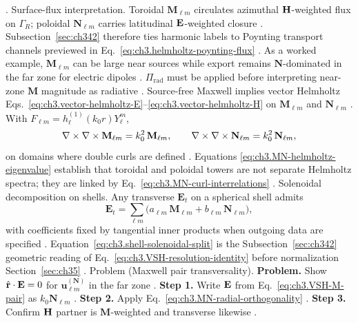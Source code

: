 \cite{harrington2001}.
Surface-flux interpretation. Toroidal \(\mathbf{M}_{\ell m}\) circulates azimuthal \(\mathbf{H}\)-weighted flux on \(\Gamma_R\); poloidal \(\mathbf{N}_{\ell m}\)
carries latitudinal \(\mathbf{E}\)-weighted closure \cite{stratton1941}. Subsection~\ref{sec:ch342} therefore ties
harmonic labels to Poynting transport channels previewed in Eq.~\eqref{eq:ch3.helmholtz-poynting-flux}
\cite{poynting1884}.
As a worked example, \(\mathbf{M}_{\ell m}\) can be large near sources while export remains \(\mathbf{N}\)-dominated in the far zone for
electric dipoles \cite{harrington2001}. \(\Pi_{\mathrm{rad}}\) must be applied before interpreting near-zone
\(\mathbf{M}\) magnitude as radiative \cite{harrington2001}.
Source-free Maxwell implies vector Helmholtz Eqs.~\eqref{eq:ch3.vector-helmholtz-E}--\eqref{eq:ch3.vector-helmholtz-H}
on \(\mathbf{M}_{\ell m}\) and \(\mathbf{N}_{\ell m}\) \cite{stratton1941}. With
\(F_{\ell m}=h_{\ell}^{(1)}(k_{0}r)Y_{\ell}^{m}\),
\begin{equation}
\label{eq:ch3.MN-helmholtz-eigenvalue}
\nabla\times\nabla\times\mathbf{M}_{\ell m}
=
k_{0}^{2}\,\mathbf{M}_{\ell m},
\qquad
\nabla\times\nabla\times\mathbf{N}_{\ell m}
=
k_{0}^{2}\,\mathbf{N}_{\ell m},
\end{equation}
on domains where double curls are defined \cite{tai1994}. Equations
\eqref{eq:ch3.MN-helmholtz-eigenvalue} establish that toroidal and poloidal towers are not separate Helmholtz spectra;
they are linked by Eq.~\eqref{eq:ch3.MN-curl-interrelations} \cite{stratton1941}.
Solenoidal decomposition on shells. Any transverse \(\mathbf{E}_t\) on a spherical shell admits
\begin{equation}
\label{eq:ch3.shell-solenoidal-split}
\mathbf{E}_t
=
\sum_{\ell m}\big(
a_{\ell m}\,\mathbf{M}_{\ell m}
+
b_{\ell m}\,\mathbf{N}_{\ell m}
\big),
\end{equation}
with coefficients fixed by tangential inner products when outgoing data are specified \cite{hansen1988}.
Equation~\eqref{eq:ch3.shell-solenoidal-split} is the Subsection~\ref{sec:ch342} geometric reading of
Eq.~\eqref{eq:ch3.VSH-resolution-identity} before normalization Section~\ref{sec:ch35} \cite{harrington2001}.
Problem (Maxwell pair transversality). \textbf{Problem.} Show \(\hat{\mathbf{r}}\cdot\mathbf{E}=0\) for \(\mathbf{u}_{\ell m}^{(\mathbf{N})}\) in the far zone
\cite{stratton1941}.
\textbf{Step 1.} Write \(\mathbf{E}\) from Eq.~\eqref{eq:ch3.VSH-M-pair} as \(k_{0}\mathbf{N}_{\ell m}\) \cite{stratton1941}.
\textbf{Step 2.} Apply Eq.~\eqref{eq:ch3.MN-radial-orthogonality} \cite{tai1994}.
\textbf{Step 3.} Confirm \(\mathbf{H}\) partner is \(\mathbf{M}\)-weighted and transverse likewise \cite{hansen1988}.
